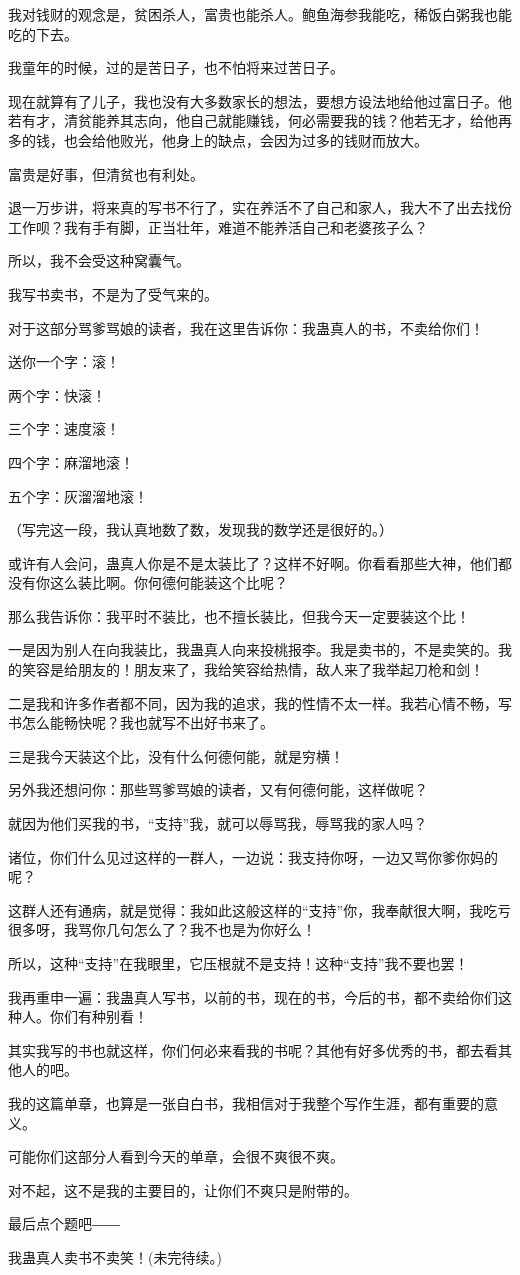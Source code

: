 \begin{this_body}
我对钱财的观念是，贫困杀人，富贵也能杀人。鲍鱼海参我能吃，稀饭白粥我也能吃的下去。

我童年的时候，过的是苦日子，也不怕将来过苦日子。

现在就算有了儿子，我也没有大多数家长的想法，要想方设法地给他过富日子。他若有才，清贫能养其志向，他自己就能赚钱，何必需要我的钱？他若无才，给他再多的钱，也会给他败光，他身上的缺点，会因为过多的钱财而放大。

富贵是好事，但清贫也有利处。

退一万步讲，将来真的写书不行了，实在养活不了自己和家人，我大不了出去找份工作呗？我有手有脚，正当壮年，难道不能养活自己和老婆孩子么？

所以，我不会受这种窝囊气。

我写书卖书，不是为了受气来的。

对于这部分骂爹骂娘的读者，我在这里告诉你：我蛊真人的书，不卖给你们！

送你一个字：滚！

两个字：快滚！

三个字：速度滚！

四个字：麻溜地滚！

五个字：灰溜溜地滚！

（写完这一段，我认真地数了数，发现我的数学还是很好的。）

或许有人会问，蛊真人你是不是太装比了？这样不好啊。你看看那些大神，他们都没有你这么装比啊。你何德何能装这个比呢？

那么我告诉你：我平时不装比，也不擅长装比，但我今天一定要装这个比！

一是因为别人在向我装比，我蛊真人向来投桃报李。我是卖书的，不是卖笑的。我的笑容是给朋友的！朋友来了，我给笑容给热情，敌人来了我举起刀枪和剑！

二是我和许多作者都不同，因为我的追求，我的性情不太一样。我若心情不畅，写书怎么能畅快呢？我也就写不出好书来了。

三是我今天装这个比，没有什么何德何能，就是穷横！

另外我还想问你：那些骂爹骂娘的读者，又有何德何能，这样做呢？

就因为他们买我的书，“支持”我，就可以辱骂我，辱骂我的家人吗？

诸位，你们什么见过这样的一群人，一边说：我支持你呀，一边又骂你爹你妈的呢？

这群人还有通病，就是觉得：我如此这般这样的“支持”你，我奉献很大啊，我吃亏很多呀，我骂你几句怎么了？我不也是为你好么！

所以，这种“支持”在我眼里，它压根就不是支持！这种“支持”我不要也罢！

我再重申一遍：我蛊真人写书，以前的书，现在的书，今后的书，都不卖给你们这种人。你们有种别看！

其实我写的书也就这样，你们何必来看我的书呢？其他有好多优秀的书，都去看其他人的吧。

我的这篇单章，也算是一张自白书，我相信对于我整个写作生涯，都有重要的意义。

可能你们这部分人看到今天的单章，会很不爽很不爽。

对不起，这不是我的主要目的，让你们不爽只是附带的。

最后点个题吧――

我蛊真人卖书不卖笑！(未完待续。)

\end{this_body}

